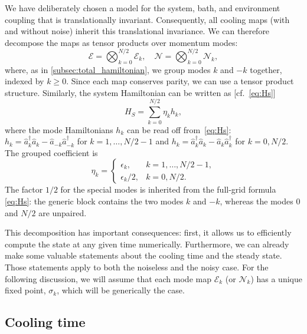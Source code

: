 \documentclass[aps,prx,twocolumn,superscriptaddress,nofootinbib,nolongbibliography,nobalancelastpage,10pt,floatfix]{revtex4-2}
\begin{document}
We have deliberately chosen a model for the system, bath, and environment coupling that is translationally invariant. Consequently, all cooling maps (with and without noise) inherit this translational invariance. We can therefore decompose the maps as tensor products over momentum modes:
\begin{equation}
    \mathcal{E}=\bigotimes_{k=0}^{N/2} \mathcal{E}_k, \quad \mathcal{N}=\bigotimes_{k=0}^{N/2} \mathcal{N}_k,
    \label{eq:CPMk}
\end{equation}
where, as in \cref{subsec:total_hamiltonian}, we group modes $k$ and $-k$ together, indexed by $k\ge 0$. Since each map conserves parity, we can use a tensor product structure.
Similarly, the system Hamiltonian can be written as [cf.~\cref{eq:Hs}]
\begin{equation}
    H_{S} = \sum_{k=0}^{N/2} \eta_k h_k,
    \label{eq:Hs_grouped}
\end{equation}
where the mode Hamiltonians $h_k$ can be read off from~\cref{eq:Hs}: $h_k=\hat{a}^\dagger_k \hat{a}_k-\hat{a}_{-k}\hat{a}_{-k}^\dagger$ for $k=1,\ldots,N/2-1$ and $h_k=\hat{a}_k^\dagger \hat{a}_k-\hat{a}_k \hat{a}_k^\dagger$ for $k=0,N/2$.  The grouped coefficient is
\begin{equation}
    \eta_k =
    \begin{cases}
        \epsilon_k, & k=1,\ldots,N/2-1,\\[2mm]
        \epsilon_k/2, & k=0,N/2.
    \end{cases}
    \label{eq:grouped_mode_weight}
\end{equation}
The factor $1/2$ for the special modes is inherited from the full-grid formula
\cref{eq:Hs}: the generic block contains the two modes $k$ and $-k$, whereas
the modes $0$ and $N/2$ are unpaired.

This decomposition has important consequences: first, it allows us to efficiently compute the state at any given time numerically. Furthermore, we can already make some valuable statements about the cooling time and the steady state. Those statements apply to both the noiseless and the noisy case. For the following discussion, we will assume that each mode map $\mathcal{E}_k$ (or $\mathcal{N}_k$) has a unique fixed point, $\sigma_k$, which will be generically the case.

\subsection{Cooling time}
\end{document}
